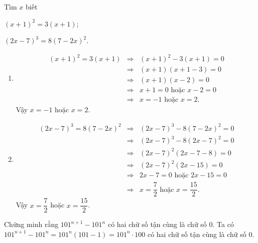 \begin{vn}
	Tìm $x$ biết
	\begin{listEX}[2]
		\item $(x+1)^2=3(x+1)$;
		\item $(2x-7)^3=8(7-2x)^2$.
	\end{listEX}
	\loigiai
	{
		\begin{enumerate}
			\item
			{\allowdisplaybreaks\begin{eqnarray*}
			(x+1)^2=3(x+1)	&\Rightarrow& (x+1)^2-3(x+1)=0\\
				&\Rightarrow& (x+1)(x+1-3)=0\\
					&\Rightarrow& (x+1)(x-2)=0\\
				&\Rightarrow& x+1=0 \text{ hoặc } x-2=0\\
				&\Rightarrow& x=-1\text{ hoặc } x=2.
			\end{eqnarray*}} 
			Vậy $x=-1$ hoặc $x=2$.
			\item
			{\allowdisplaybreaks\begin{eqnarray*}
				(2x-7)^3=8(7-2x)^2	&\Rightarrow& (2x-7)^3-8(7-2x)^2=0\\
				&\Rightarrow& (2x-7)^3-8(2x-7)^2=0\\
					&\Rightarrow& (2x-7)^2(2x-7-8)=0\\
						&\Rightarrow& (2x-7)^2(2x-15)=0\\
				&\Rightarrow& 2x-7=0 \text{ hoặc } 2x-15=0\\
				&\Rightarrow& x=\dfrac{7}{2}\text{ hoặc } x=\dfrac{15}{2}.
			\end{eqnarray*}} 
			Vậy $x=\dfrac{7}{2}$ hoặc $x=\dfrac{15}{2}$.
		\end{enumerate}
	}
\end{vn}

\begin{vn}
Chứng minh rằng $101^{n+1}-101^n$ có hai chữ số tận cùng là chữ số $0$.
	\loigiai
{
	Ta có $101^{n+1}-101^n= 101^n(101-1)=101^n \cdot 100 $ có hai chữ số tận cùng là chữ số $0$.
}
\end{vn}


	

